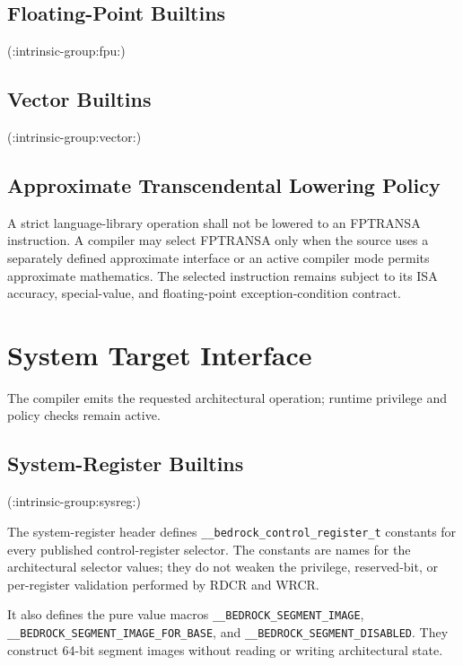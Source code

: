 \documentclass[10pt,twoside]{article}
\begin{document}
\subsection{Floating-Point Builtins}
(:intrinsic-group:fpu:)

\subsection{Vector Builtins}
(:intrinsic-group:vector:)

\subsection{Approximate Transcendental Lowering Policy}
A strict language-library operation shall not be lowered to an FPTRANSA
instruction. A compiler may select FPTRANSA only when the source uses a
separately defined approximate interface or an active compiler mode permits
approximate mathematics. The selected instruction remains subject to its ISA
accuracy, special-value, and floating-point exception-condition contract.

\section{System Target Interface}\label{page:system-target-interface}
The compiler emits the requested architectural operation; runtime privilege and policy checks
remain active.

\subsection{System-Register Builtins}
(:intrinsic-group:sysreg:)

The system-register header defines \texttt{\_\_bedrock\_control\_register\_t} constants for every published
control-register selector. The constants are names for the architectural selector values; they do not weaken the
privilege, reserved-bit, or per-register validation performed by RDCR and WRCR.

It also defines the pure value macros
\texttt{\_\allowbreak{}\_\allowbreak{}BEDROCK\_\allowbreak{}SEGMENT\_\allowbreak{}IMAGE},
\texttt{\_\allowbreak{}\_\allowbreak{}BEDROCK\_\allowbreak{}SEGMENT\_\allowbreak{}IMAGE\_\allowbreak{}FOR\_\allowbreak{}BASE}, and
\texttt{\_\allowbreak{}\_\allowbreak{}BEDROCK\_\allowbreak{}SEGMENT\_\allowbreak{}DISABLED}. They construct 64-bit segment
images without reading or writing architectural state.
\end{document}
